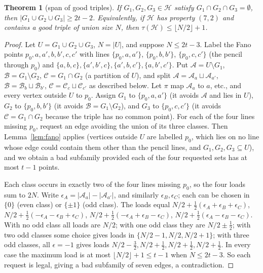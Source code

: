 \documentclass[11pt]{amsart}
\newtheorem{theorem}{Theorem}[section]
\theoremstyle{definition}
\theoremstyle{remark}
\newcommand{\cH}{\mathcal H}
\newcommand{\floor}[1]{\lfloor #1\rfloor}
\begin{document}
\begin{theorem}[span of good triples]\label{thm:GT}
If $G_1,G_2,G_3\in\cH$ satisfy $G_1\cap G_2\cap G_3=\emptyset$, then $|G_1\cup G_2\cup G_3|\ge2t-2$. Equivalently, if $\cH$ has property $(7,2)$ and contains a good triple of union size $N$, then $\tau(\cH)\le\floor{N/2}+1$.
\end{theorem}
\begin{proof}
Let $U=G_1\cup G_2\cup G_3$, $N=|U|$, and suppose $N\le2t-3$. Label the Fano points $p_0,a,a',b,b',c,c'$ with lines $\{p_0,a,a'\}$, $\{p_0,b,b'\}$, $\{p_0,c,c'\}$ (the pencil through $p_0$) and $\{a,b,c\},\{a',b',c\},\{a',b,c'\},\{a,b',c'\}$. Put $\mathcal A=U\setminus G_1$, $\mathcal B=G_1\setminus G_2$, $\mathcal C=G_1\cap G_2$ (a partition of $U$), and split $\mathcal A=\mathcal A_a\sqcup\mathcal A_{a'}$, $\mathcal B=\mathcal B_b\sqcup\mathcal B_{b'}$, $\mathcal C=\mathcal C_c\sqcup\mathcal C_{c'}$ as described below. Let $\pi$ map $\mathcal A_a$ to $a$, etc., and every vertex outside $U$ to $p_0$. Assign $G_1$ to $\{p_0,a,a'\}$ (it avoids $\mathcal A$ and lies in $U$), $G_2$ to $\{p_0,b,b'\}$ (it avoids $\mathcal B=G_1\setminus G_2$), and $G_3$ to $\{p_0,c,c'\}$ (it avoids $\mathcal C=G_1\cap G_2$ because the triple has no common point). For each of the four lines missing $p_0$, request an edge avoiding the union of its three classes. Then Lemma~\ref{lem:fano} applies (vertices outside $U$ are labelled $p_0$, which lies on no line whose edge could contain them other than the pencil lines, and $G_1,G_2,G_3\subseteq U$), and we obtain a bad subfamily provided each of the four requested sets has at most $t-1$ points.

Each class occurs in exactly two of the four lines missing $p_0$, so the four loads sum to $2N$. Write $\epsilon_A=|\mathcal A_a|-|\mathcal A_{a'}|$, and similarly $\epsilon_B,\epsilon_C$; each can be chosen in $\{0\}$ (even class) or $\{\pm1\}$ (odd class). The loads equal $N/2+\tfrac12(\epsilon_A+\epsilon_B+\epsilon_C)$, $N/2+\tfrac12(-\epsilon_A-\epsilon_B+\epsilon_C)$, $N/2+\tfrac12(-\epsilon_A+\epsilon_B-\epsilon_C)$, $N/2+\tfrac12(\epsilon_A-\epsilon_B-\epsilon_C)$. With no odd class all loads are $N/2$; with one odd class they are $N/2\pm\frac12$; with two odd classes some choice gives loads in $\{N/2-1,N/2,N/2+1\}$; with three odd classes, all $\epsilon=-1$ gives loads $N/2-\tfrac32,N/2+\tfrac12,N/2+\tfrac12,N/2+\tfrac12$. In every case the maximum load is at most $\floor{N/2}+1\le t-1$ when $N\le2t-3$. So each request is legal, giving a bad subfamily of seven edges, a contradiction.
\end{proof}
\end{document}
